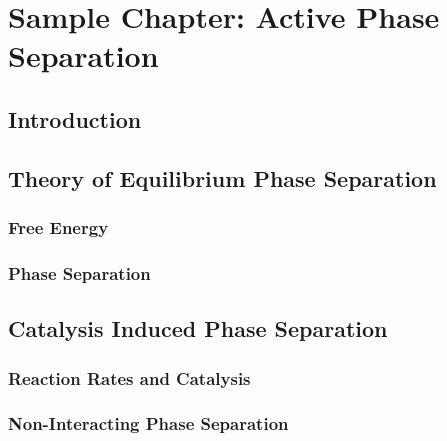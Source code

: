 

\chapter{\label{ch:2-draft}Sample Chapter: Active Phase Separation}

\minitoc

\section{Introduction}

\section{Theory of Equilibrium Phase Separation}

\subsection{Free Energy}

\subsection{Phase Separation}

\subsection{}

\section{Catalysis Induced Phase Separation}

\subsection{Reaction Rates and Catalysis}

\subsection{Non-Interacting Phase Separation}

